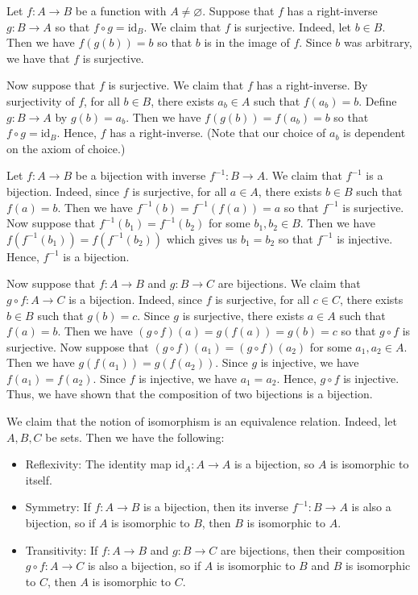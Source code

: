 \exercise Let $f : A \to B$ be a function with $A \neq \varnothing$. Suppose that $f$ has a right-inverse $g : B \to A$ so that $f\circ g = \text{id}_B$. We claim that $f$ is surjective. Indeed, let $b\in B$. Then we have $f(g(b)) = b$ so that $b$ is in the image of $f$. Since $b$ was arbitrary, we have that $f$ is surjective.

Now suppose that $f$ is surjective. We claim that $f$ has a right-inverse. By surjectivity of $f$, for all $b \in B$, there exists $a_b \in A$ such that $f(a_b) = b$. Define $g : B \to A$ by $g(b) = a_b$. Then we have $f(g(b)) = f(a_b) = b$ so that $f\circ g = \text{id}_B$. Hence, $f$ has a right-inverse. (Note that our choice of $a_b$ is dependent on the axiom of choice.)

\exercise Let $f : A \to B$ be a bijection with inverse $f^{-1} : B \to A$. We claim that $f^{-1}$ is a bijection. Indeed, since $f$ is surjective, for all $a\in A$, there exists $b\in B$ such that $f(a) = b$. Then we have $f^{-1}(b) = f^{-1}(f(a)) = a$ so that $f^{-1}$ is surjective. Now suppose that $f^{-1}(b_1) = f^{-1}(b_2)$ for some $b_1,b_2\in B$. Then we have $f(f^{-1}(b_1)) = f(f^{-1}(b_2))$ which gives us $b_1 = b_2$ so that $f^{-1}$ is injective. Hence, $f^{-1}$ is a bijection.

Now suppose that $f : A \to B$ and $g : B \to C$ are bijections. We claim that $g\circ f : A \to C$ is a bijection. Indeed, since $f$ is surjective, for all $c\in C$, there exists $b\in B$ such that $g(b) = c$. Since $g$ is surjective, there exists $a\in A$ such that $f(a) = b$. Then we have $(g\circ f)(a) = g(f(a)) = g(b) = c$ so that $g\circ f$ is surjective. Now suppose that $(g\circ f)(a_1) = (g\circ f)(a_2)$ for some $a_1,a_2\in A$. Then we have $g(f(a_1)) = g(f(a_2))$. Since $g$ is injective, we have $f(a_1) = f(a_2)$. Since $f$ is injective, we have $a_1 = a_2$. Hence, $g\circ f$ is injective. Thus, we have shown that the composition of two bijections is a bijection.

\exercise We claim that the notion of isomorphism is an equivalence relation. Indeed, let $A,B,C$ be sets. Then we have the following:
\begin{itemize}
    \item Reflexivity: The identity map $\text{id}_A : A \to A$ is a bijection, so $A$ is isomorphic to itself.
    \item Symmetry: If $f : A \to B$ is a bijection, then its inverse $f^{-1} : B \to A$ is also a bijection, so if $A$ is isomorphic to $B$, then $B$ is isomorphic to $A$.
    \item Transitivity: If $f : A \to B$ and $g : B \to C$ are bijections, then their composition $g\circ f : A \to C$ is also a bijection, so if $A$ is isomorphic to $B$ and $B$ is isomorphic to $C$, then $A$ is isomorphic to $C$.
\end{itemize}

